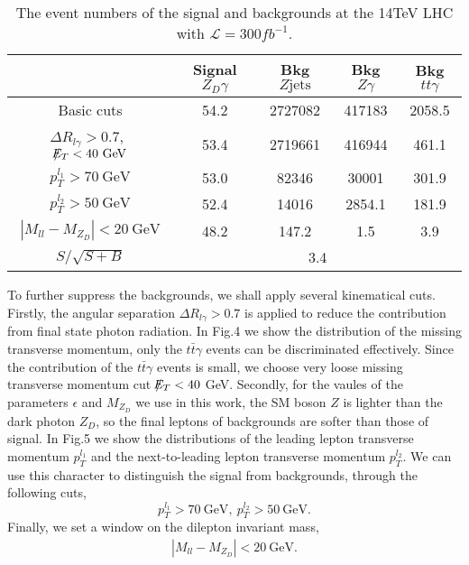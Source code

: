 \documentclass{article}
\begin{document}
\begin{table}[!hbp]
\begin{center}
\caption{The event numbers of the signal and backgrounds at the 14TeV LHC with $\mathcal{L}=300 fb^{-1}$.}
\begin{tabular}{c|c|c|c|c}

\hline
 &Signal $Z_D\gamma$&Bkg $Z\text{jets}$&Bkg $Z\gamma$&Bkg $tt\gamma$\\

\hline
Basic cuts                  &54.2   &2727082   &417183 &2058.5 \\
$\Delta R_{l\gamma}>0.7$,\ $/\kern-0.65em E_T<40\ \text{GeV}$  &53.4   &2719661  &416944 &461.1    \\
$p_T^{l_1}>70\ \text{GeV}$  &53.0  &82346  &30001 &301.9    \\
$p_T^{l_2}>50\ \text{GeV}$        &52.4   &14016  &2854.1 &181.9     \\
$\left |M_{ll}-M_{Z_D}\right |<20\ \text{GeV}$
                           &48.2  &147.2   &1.5  &3.9     \\

\hline
$S/\sqrt{S+B}$&\multicolumn{4}{|c}{3.4}\\
\hline

\end{tabular}
\end{center}
\end{table}
To further suppress the backgrounds, we shall apply several kinematical cuts. Firstly, the angular separation $\Delta R_{l\gamma}>0.7$ is  applied to reduce the contribution from final state photon radiation. In Fig.4 we show the distribution of the missing transverse momentum, only the $t\bar{t}\gamma$ events can be discriminated effectively. Since the contribution of the $t\bar{t}\gamma$ events is small, we choose very  loose missing transverse momentum cut $/\kern-0.65em E_T<40$ GeV.
Secondly, for the vaules of the parameters $\epsilon$ and $M_{Z_D}$ we use in this work, the SM boson $Z$  is lighter than the dark photon $Z_D$, so the final leptons of backgrounds are  softer than those of signal. In Fig.5 we show the distributions of the leading lepton transverse momentum $p_T^{l_1}$ and the next-to-leading lepton transverse momentum $p_T^{l_2}$. We can use this character to distinguish  the signal from backgrounds, through the following cuts,
\begin{equation}
p_T^{l_1}>70\ \text{GeV},\ p_T^{l_2}>50\ \text{GeV}.
\end{equation}
 Finally, we set a window on the dilepton invariant mass,
 \begin{align}
 \left |M_{ll}-M_{Z_D}\right |<20 \ \text{GeV}.
 \end{align}
\end{document}
